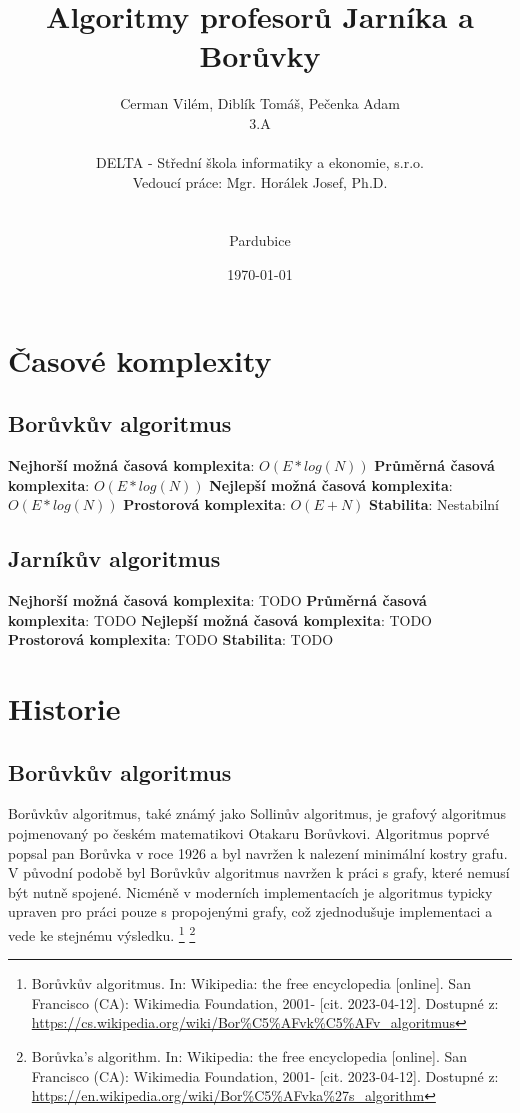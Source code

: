 \documentclass[11pt]{article}
\author{Cerman Vilém, Diblík Tomáš, Pečenka Adam \\ 3.A \\\\ DELTA - Střední škola informatiky a ekonomie, s.r.o.\\Vedoucí práce: Mgr. Horálek Josef, Ph.D.\\\\\\Pardubice}
\title{Algoritmy profesorů Jarníka a Borůvky}
\date{\selectlanguage{czech}\today}
\begin{document}
\maketitle
\thispagestyle{empty}
\pagebreak

\tableofcontents
\thispagestyle{empty}
\pagebreak

\setcounter{page}{1}
\section{Časové komplexity}

\subsection{Borůvkův algoritmus}

\medbreak
\textbf{Nejhorší možná časová komplexita}: $O(E * log(N))$
\medbreak\noindent
\textbf{Průměrná časová komplexita}: $O(E * log(N))$
\medbreak\noindent
\textbf{Nejlepší možná časová komplexita}: $O(E * log(N))$
\medbreak\noindent
\textbf{Prostorová komplexita}: $O(E + N)$
\medbreak\noindent
\textbf{Stabilita}: Nestabilní
\medbreak

\subsection{Jarníkův algoritmus}

\medbreak
\textbf{Nejhorší možná časová komplexita}: TODO
\medbreak\noindent
\textbf{Průměrná časová komplexita}: TODO
\medbreak\noindent
\textbf{Nejlepší možná časová komplexita}: TODO
\medbreak\noindent
\textbf{Prostorová komplexita}: TODO
\medbreak\noindent
\textbf{Stabilita}: TODO
\medbreak

\pagebreak


\section{Historie}

\subsection{Borůvkův algoritmus}
Borůvkův algoritmus, také známý jako Sollinův algoritmus, je grafový algoritmus pojmenovaný po českém matematikovi Otakaru Borůvkovi. Algoritmus poprvé popsal pan Borůvka v roce 1926 a byl navržen k nalezení minimální kostry grafu. V původní podobě byl Borůvkův algoritmus navržen k práci s grafy, které nemusí být nutně spojené. Nicméně v moderních implementacích je algoritmus typicky upraven pro práci pouze s propojenými grafy, což zjednodušuje implementaci a vede ke stejnému výsledku.
\footnote{Borůvkův algoritmus. In: Wikipedia: the free encyclopedia [online]. San Francisco (CA): Wikimedia Foundation, 2001- [cit. 2023-04-12]. Dostupné z: \url{https://cs.wikipedia.org/wiki/Bor\%C5\%AFvk\%C5\%AFv_algoritmus}}
\footnote{Borůvka's algorithm. In: Wikipedia: the free encyclopedia [online]. San Francisco (CA): Wikimedia Foundation, 2001- [cit. 2023-04-12]. Dostupné z: \url{https://en.wikipedia.org/wiki/Bor\%C5\%AFvka\%27s_algorithm}}
\end{document}
